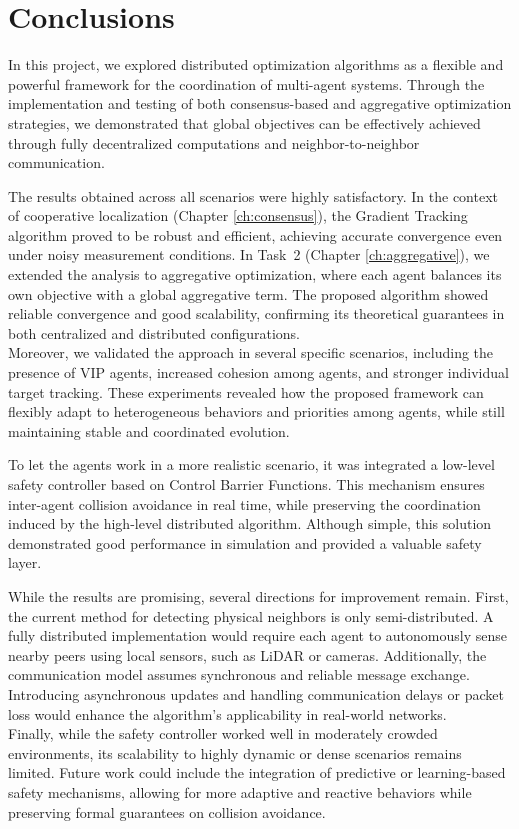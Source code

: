 \chapter*{Conclusions}

In this project, we explored distributed optimization algorithms as a flexible and powerful framework for the coordination of multi-agent systems. Through the implementation and testing of both consensus-based and aggregative optimization strategies, we demonstrated that global objectives can be effectively achieved through fully decentralized computations and neighbor-to-neighbor communication.

\bigskip

The results obtained across all scenarios were highly satisfactory. In the context of cooperative localization (Chapter \ref{ch:consensus}), the Gradient Tracking algorithm proved to be robust and efficient, achieving accurate convergence even under noisy measurement conditions. In Task~2 (Chapter \ref{ch:aggregative}), we extended the analysis to aggregative optimization, where each agent balances its own objective with a global aggregative term. The proposed algorithm showed reliable convergence and good scalability, confirming its theoretical guarantees in both centralized and distributed configurations. \\
Moreover, we validated the approach in several specific scenarios, including the presence of VIP agents, increased cohesion among agents, and stronger individual target tracking. These experiments revealed how the proposed framework can flexibly adapt to heterogeneous behaviors and priorities among agents, while still maintaining stable and coordinated evolution.

\bigskip

To let the agents work in a more realistic scenario, it was integrated a low-level safety controller based on Control Barrier Functions. This mechanism ensures inter-agent collision avoidance in real time, while preserving the coordination induced by the high-level distributed algorithm. Although simple, this solution demonstrated good performance in simulation and provided a valuable safety layer.

\bigskip
While the results are promising, several directions for improvement remain. First, the current method for detecting physical neighbors is only semi-distributed. A fully distributed implementation would require each agent to autonomously sense nearby peers using local sensors, such as LiDAR or cameras. Additionally, the communication model assumes synchronous and reliable message exchange. Introducing asynchronous updates and handling communication delays or packet loss would enhance the algorithm's applicability in real-world networks. \\
Finally, while the safety controller worked well in moderately crowded environments, its scalability to highly dynamic or dense scenarios remains limited. Future work could include the integration of predictive or learning-based safety mechanisms, allowing for more adaptive and reactive behaviors while preserving formal guarantees on collision avoidance.





